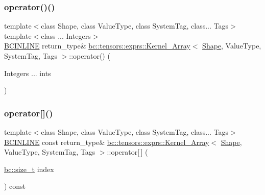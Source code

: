 \mbox{\label{structbc_1_1tensors_1_1exprs_1_1Kernel__Array_a53f0cee4dd8a9775ef56b19b9498072d}} 
\subsubsection{\texorpdfstring{operator()()}{operator()()}\hspace{0.1cm}{\footnotesize\ttfamily [2/2]}}
{\footnotesize\ttfamily template$<$class Shape, class Value\+Type, class System\+Tag, class... Tags$>$ \\
template$<$class ... Integers$>$ \\
\hyperlink{common_8h_a6699e8b0449da5c0fafb878e59c1d4b1}{B\+C\+I\+N\+L\+I\+NE} return\+\_\+type\& \hyperlink{structbc_1_1tensors_1_1exprs_1_1Kernel__Array}{bc\+::tensors\+::exprs\+::\+Kernel\+\_\+\+Array}$<$ \hyperlink{structbc_1_1Shape}{Shape}, Value\+Type, System\+Tag, Tags $>$\+::operator() (\begin{DoxyParamCaption}\item[{Integers ...}]{ints }\end{DoxyParamCaption})\hspace{0.3cm}{\ttfamily [inline]}}

\mbox{\label{structbc_1_1tensors_1_1exprs_1_1Kernel__Array_a29d6f89a439f2abef2236e9552c07e62}} 
\subsubsection{\texorpdfstring{operator[]()}{operator[]()}\hspace{0.1cm}{\footnotesize\ttfamily [1/2]}}
{\footnotesize\ttfamily template$<$class Shape, class Value\+Type, class System\+Tag, class... Tags$>$ \\
\hyperlink{common_8h_a6699e8b0449da5c0fafb878e59c1d4b1}{B\+C\+I\+N\+L\+I\+NE} const return\+\_\+type\& \hyperlink{structbc_1_1tensors_1_1exprs_1_1Kernel__Array}{bc\+::tensors\+::exprs\+::\+Kernel\+\_\+\+Array}$<$ \hyperlink{structbc_1_1Shape}{Shape}, Value\+Type, System\+Tag, Tags $>$\+::operator\mbox{[}$\,$\mbox{]} (\begin{DoxyParamCaption}\item[{\hyperlink{namespacebc_aaf8e3fbf99b04b1b57c4f80c6f55d3c5}{bc\+::size\+\_\+t}}]{index }\end{DoxyParamCaption}) const\hspace{0.3cm}{\ttfamily [inline]}}

